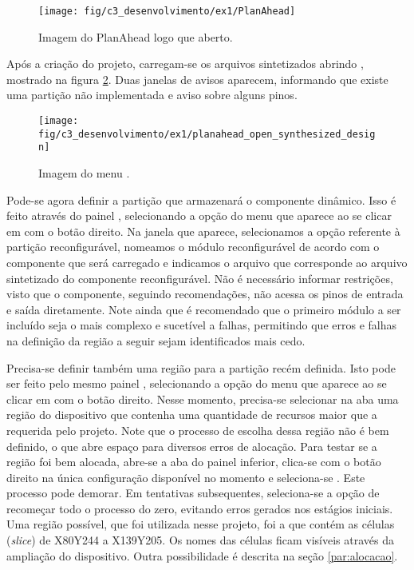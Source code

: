 \documentclass[11pt,a4paper,oneside]{book}
\begin{document}
\begin{figure}[h]
\centering
\texttt{[image: fig/c3\_desenvolvimento/ex1/PlanAhead]}
\caption{Imagem do PlanAhead logo que aberto.}
\label{fig:ex1:planahead}
\end{figure}

Após a criação do projeto, carregam-se os arquivos sintetizados abrindo , mostrado na figura \ref{fig:ex1:planahead_open_synthesized_design}.
Duas janelas de avisos aparecem, informando que existe uma partição não implementada e aviso sobre alguns pinos.

\begin{figure}[h]
\centering
\texttt{[image: fig/c3\_desenvolvimento/ex1/planahead\_open\_synthesized\_design]}
\caption{Imagem do menu .}
\label{fig:ex1:planahead_open_synthesized_design}
\end{figure}


Pode-se agora definir a partição que armazenará o componente dinâmico.
Isso é feito através do painel , selecionando a opção  do menu que aparece ao se clicar em  com o botão direito.
Na janela que aparece, selecionamos a opção referente à partição reconfigurável, nomeamos o módulo reconfigurável de acordo com o componente que será carregado e indicamos o arquivo que corresponde ao arquivo sintetizado do componente reconfigurável.
Não é necessário informar restrições, visto que o componente, seguindo recomendações, não acessa os pinos de entrada e saída diretamente.
Note ainda que é recomendado que o primeiro módulo a ser incluído seja o mais complexo e sucetível a falhas, permitindo que erros e falhas na definição da região a seguir sejam identificados mais cedo.

Precisa-se definir também uma região para a partição recém definida.
Isto pode ser feito pelo mesmo painel , selecionando a opção  do menu que aparece ao se clicar em  com o botão direito.
Nesse momento, precisa-se selecionar na aba  uma região do dispositivo que contenha uma quantidade de recursos maior que a requerida pelo projeto.
Note que o processo de escolha dessa região não é bem definido, o que abre espaço para diversos erros de alocação.
Para testar se a região foi bem alocada, abre-se a aba  do painel inferior, clica-se com o botão direito na única configuração disponível no momento e seleciona-se .
Este processo pode demorar.
Em tentativas subsequentes, seleciona-se a opção de recomeçar todo o processo do zero, evitando erros gerados nos estágios iniciais.
Uma região possível, que foi utilizada nesse projeto, foi a que contém as células (\textit{slice}) de X80Y244 a X139Y205.
Os nomes das células ficam visíveis através da ampliação do dispositivo.
Outra possibilidade é descrita na seção \ref{par:alocacao}.
\end{document}
